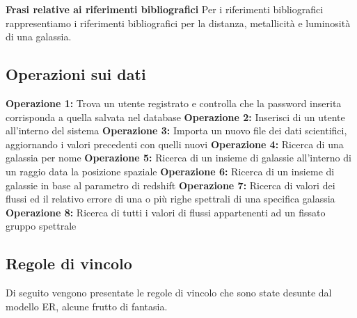 \documentclass[12pt,a4paper,onecolumn,x11names]{article}
\begin{document}
	\begin{framed}
		\begin{flushleft}
			\textbf{Frasi relative ai riferimenti bibliografici}\newline
			Per i riferimenti bibliografici rappresentiamo i riferimenti bibliografici per la distanza, metallicità e luminosità di una galassia.
		\end{flushleft}
	\end{framed}
	
	\subsection{Operazioni sui dati}
		\begin{flushleft}
			\textbf{Operazione 1:} Trova un utente registrato e controlla che la password inserita corrisponda a quella salvata nel database\newline\newline
			\textbf{Operazione 2:} Inserisci di un utente all'interno del sistema\newline\newline
			\textbf{Operazione 3:} Importa un nuovo file dei dati scientifici, aggiornando i valori precedenti con quelli nuovi\newline\newline
			\textbf{Operazione 4:} Ricerca di una galassia per nome\newline\newline
			\textbf{Operazione 5:} Ricerca di un insieme di galassie all'interno di un raggio data la posizione spaziale\newline\newline
			\textbf{Operazione 6:} Ricerca di un insieme di galassie in base al parametro di redshift\newline\newline
			\textbf{Operazione 7:} Ricerca di valori dei flussi ed il relativo errore di una o più righe spettrali di una specifica galassia\newline\newline
			\textbf{Operazione 8:} Ricerca di tutti i valori di flussi appartenenti ad un fissato gruppo spettrale
		\end{flushleft}
	
	\subsection{Regole di vincolo}
		Di seguito vengono presentate le regole di vincolo che sono state desunte dal modello ER, alcune frutto di fantasia.
		
\end{document}

